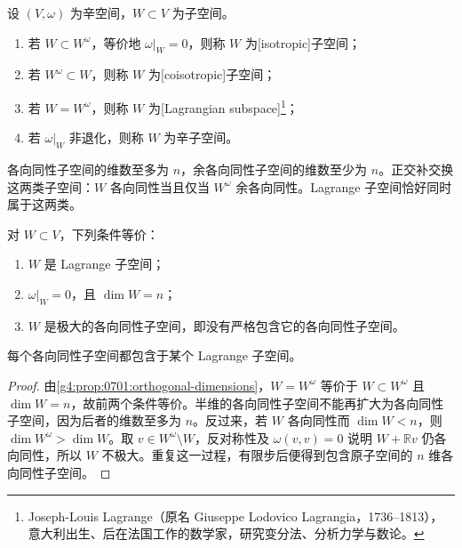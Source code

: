 \begin{definition}\label{g4:def:0701:subspace-types}
	设 \((V,\omega)\) 为辛空间，\(W\subset V\) 为子空间。
	\begin{enumerate}
		\item 若 \(W\subset W^\omega\)，等价地 \(\omega|_W=0\)，则称 \(W\) 为[isotropic]子空间；
		\item 若 \(W^\omega\subset W\)，则称 \(W\) 为[coisotropic]子空间；
		\item 若 \(W=W^\omega\)，则称 \(W\) 为[Lagrangian subspace]\footnote{Joseph-Louis Lagrange（原名 Giuseppe Lodovico Lagrangia，1736--1813），意大利出生、后在法国工作的数学家，研究变分法、分析力学与数论。}；
		\item 若 \(\omega|_W\) 非退化，则称 \(W\) 为辛子空间。
	\end{enumerate}
\end{definition}

各向同性子空间的维数至多为 \(n\)，余各向同性子空间的维数至少为 \(n\)。正交补交换这两类子空间：\(W\) 各向同性当且仅当 \(W^\omega\) 余各向同性。Lagrange 子空间恰好同时属于这两类。

\begin{proposition}\label{g4:prop:0701:lagrangian-characterizations}
	对 \(W\subset V\)，下列条件等价：
	\begin{enumerate}
		\item \(W\) 是 Lagrange 子空间；
		\item \(\omega|_W=0\)，且 \(\dim W=n\)；
		\item \(W\) 是极大的各向同性子空间，即没有严格包含它的各向同性子空间。
	\end{enumerate}
	每个各向同性子空间都包含于某个 Lagrange 子空间。
\end{proposition}
\begin{proof}
	由\cref{g4:prop:0701:orthogonal-dimensions}，\(W=W^\omega\) 等价于 \(W\subset W^\omega\) 且 \(\dim W=n\)，故前两个条件等价。半维的各向同性子空间不能再扩大为各向同性子空间，因为后者的维数至多为 \(n\)。反过来，若 \(W\) 各向同性而 \(\dim W<n\)，则 \(\dim W^\omega>\dim W\)。取 \(v\in W^\omega\setminus W\)，反对称性及 \(\omega(v,v)=0\) 说明 \(W+\mathbb Rv\) 仍各向同性，所以 \(W\) 不极大。重复这一过程，有限步后便得到包含原子空间的 \(n\) 维各向同性子空间。
\end{proof}

